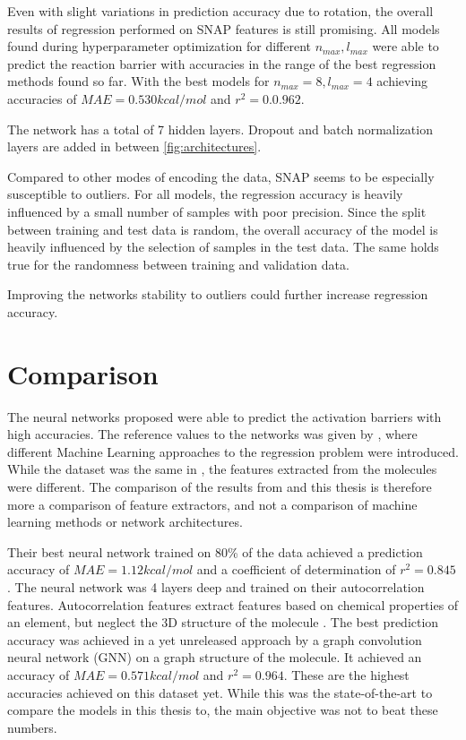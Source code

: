 Even with slight variations in prediction accuracy due to rotation, the overall results of regression performed on SNAP features is still promising.
All models found during hyperparameter optimization for different $n_{max}, l_{max}$ were able to predict the reaction barrier with accuracies in the
range of the best regression methods found so far.
With the best models for $n_{max}=8, l_{max}=4$ achieving accuracies of $MAE=0.530 kcal/mol$ and $r^2=0.0.962$. %

The network has a total of 7 hidden layers.
Dropout and batch normalization layers are added in between \ref{fig:architectures}.

Compared to other modes of encoding the data, SNAP seems to be especially susceptible to outliers.
For all models, the regression accuracy is heavily influenced by a small number of samples with poor precision.
Since the split between training and test data is random, the overall accuracy of the model is 
heavily influenced by the selection of samples in the test data.
The same holds true for the randomness between training and validation data.

Improving the networks stability to outliers could further increase regression accuracy.


\section{Comparison}
\label{sec:Evaluation:Comparison}

The neural networks proposed were able to predict the activation barriers with high accuracies.
The reference values to the networks was given by \cite{friederich_dos}, where different Machine Learning 
approaches to the regression problem were introduced.
While the dataset was the same in \cite{friederich_dos}, the features extracted from the molecules were different.
The comparison of the results from  and this thesis is therefore more 
a comparison of feature extractors, and not a comparison of machine learning methods or network architectures.

Their best neural network trained on 80\% of the data achieved a prediction accuracy of $MAE = 1.12 kcal/mol$ and a 
coefficient of determination of $r^2 = 0.845$.
The neural network was 4 layers deep and trained on their autocorrelation features.
Autocorrelation features extract features based on chemical properties of an element, but neglect the 
3D structure of the molecule \cite{friederich_dos}.
The best prediction accuracy was achieved in a yet unreleased approach by a graph convolution neural network (GNN) on 
a graph structure of the molecule.
It achieved an accuracy of $MAE = 0.571 kcal/mol$ and $r^2=0.964$.
These are the highest accuracies achieved on this dataset yet.
While this was the state-of-the-art to compare the models in this thesis to, the main objective was not to beat these numbers.

